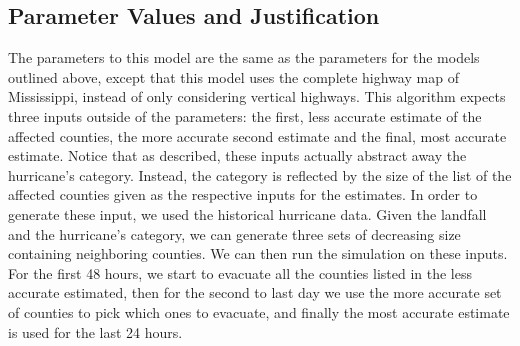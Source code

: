 \documentclass[titlepage]{article}
\begin{document}
  \subsection{Parameter Values and Justification}
    \par The parameters to this model are the same as the parameters for the models outlined above, except that this model uses the complete highway map of Mississippi, instead of only considering vertical highways. This algorithm expects three inputs outside of the parameters: the first, less accurate estimate of the affected counties, the more accurate second estimate and the final, most accurate estimate. Notice that as described, these inputs actually abstract away the hurricane's category. Instead, the category is reflected by the size of the list of the affected counties given as the respective inputs for the estimates. In order to generate these input, we used the historical hurricane data. Given the landfall and the hurricane's category, we can generate three sets of decreasing size containing neighboring counties. We can then run the simulation on these inputs. For the first 48 hours, we start to evacuate all the counties listed in the less accurate estimated, then for the second to last day we use the more accurate set of counties to pick which ones to evacuate, and finally the most accurate estimate is used for the last 24 hours.
\end{document}
